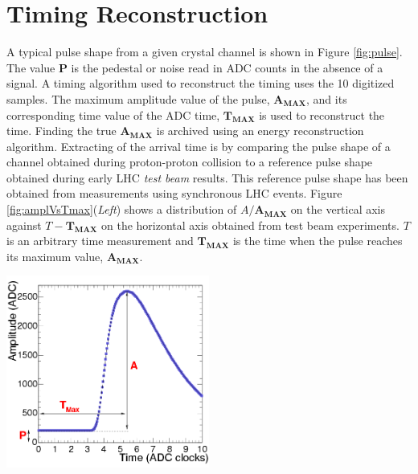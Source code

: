 \section{Timing Reconstruction}
A typical pulse shape from a given crystal channel is shown in Figure \ref{fig:pulse}. The value \textbf{P} is the pedestal or noise read in ADC counts in the absence of a signal. 
A timing algorithm used to reconstruct the timing uses the 10 digitized samples. The maximum amplitude value of the pulse, $\mathbf{A_{MAX}}$, and its corresponding time value of the ADC time, $\mathbf{T_{MAX}}$ is used to reconstruct the time. 
Finding the true $\mathbf{A_{MAX}}$ is archived using an energy reconstruction algorithm.
Extracting of the arrival time is by comparing the pulse shape of a channel obtained during proton-proton collision to a reference pulse shape obtained during early LHC \textit{test beam} results.
This reference pulse shape has been obtained from  measurements using synchronous LHC events. Figure \ref{fig:amplVsTmax}(\textit{Left}) shows a distribution of $A/\mathbf{A_{MAX}}$ on the vertical axis against $T - \mathbf{T_{MAX}}$ on the horizontal axis obtained from test beam experiments. $T$ is an arbitrary time  measurement and $\mathbf{T_{MAX}}$ is the time when the  pulse reaches its maximum value, $\mathbf{A_{MAX}}$.


\begin{center}
\centering
\mbox{\includegraphics[height=0.5\textwidth, width=0.5\textwidth]{THESISPLOTS/Time_Amplitude_Profile.png}}
\label{fig:pulse}
\end{center}

